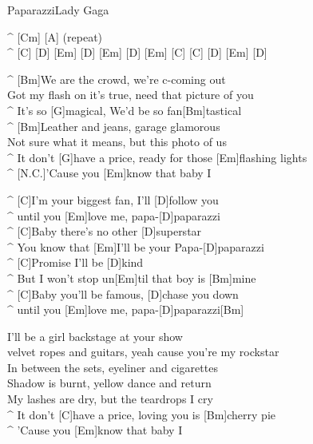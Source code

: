 \begin{song}{Paparazzi}{Lady Gaga}

\begin{guitar}
^ [Cm]   [A] \quad  (repeat)\\
^ [C] [D] [Em] [D] [Em] [D] [Em] [C] [C] [D] [Em] [D]\\

\end{guitar}
\begin{guitar}
^ [Bm]We are the crowd, we're c-coming out\\
Got my flash on it's true, need that picture of you\\
^ It's so [G]magical, We'd be so fan[Bm]tastical\\
^ [Bm]Leather and jeans, garage glamorous\\
Not sure what it means, but this photo of us\\
^ It don't [G]have a price, ready for those [Em]flashing lights\\
^ [N.C.]'Cause you [Em]know that baby I\\
\end{guitar}

\begin{guitar}
^ [C]I'm your biggest fan, I'll [D]follow you \\
^ until you [Em]love me, papa-[D]paparazzi\\
^ [C]Baby there's no other [D]superstar\\
^ You know that [Em]I'll be your Papa-[D]paparazzi\\
^ [C]Promise I'll be [D]kind\\
^ But I won't stop un[Em]til that boy is [Bm]mine\\
^ [C]Baby you'll be famous, [D]chase you down \\
^ until you [Em]love me, papa-[D]paparazzi[Bm]\\
\end{guitar}

\begin{guitar}
I'll be a girl backstage at your show\\
velvet ropes and guitars, yeah cause you're my rockstar\\
In between the sets, eyeliner and cigarettes\\
Shadow is burnt, yellow dance and return\\
My lashes are dry, but the teardrops I cry\\
^ It don't [C]have a price, loving you is [Bm]cherry pie\\
^ 'Cause you [Em]know that baby I\\
\end{guitar}

\end{song}
